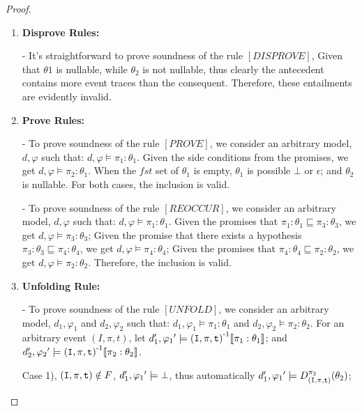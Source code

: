 \documentclass[acmsmall,10pt,review]{acmart}
\newcommand{\es}{\theta}
\newcommand{\code}[1]{{\tt{\ensuremath{\m{#1}}}}}
\newcommand{\codeme}[1]{{\tt{\ensuremath{#1}}}}
\newcommand{\bott}{\textcolor{black}{\ensuremath{\bot}}}
\newcommand{\CONTAIN}{\sqsubseteq}
\newcommand{\m}{\mathit}
\begin{document}
{{{\begin{proof}
\begin{enumerate}
  
  \item \textbf{Disprove Rules:} 
  
  - It's straightforward to prove soundness of the rule \codeme{[DISPROVE]}, Given that \codeme{ \es1} is nullable, while \codeme{ \es_2} is not nullable, thus clearly the antecedent contains more event traces than the consequent.  Therefore, these entailments are evidently invalid.\\
  
  
  \item \textbf{Prove Rules:} 
  
  - To prove soundness of the rule \code{[PROVE]}, we consider an arbitrary model, \codeme{d,  \varphi} such that:  \codeme{d,  \varphi \models  {\pi_1 : \es_1}}. Given the side conditions from the promises, we get \codeme{d,  \varphi \models {\pi_2 : \es_1}}. When the \code{\m{fst}} set of \code{\es_1} is empty, \code{\es_1} is possible \code{\bot} or \code{\epsilon}; and \code{\es_2} is nullable. For both cases, the inclusion is valid. 
  
  - To prove soundness of the rule \codeme{[REOCCUR]}, we consider an arbitrary model, \codeme{d,  \varphi} such that:  \codeme{d,  \varphi \models  {\pi_1 : \es_1}}. Given the promises that  \codeme{\pi_1 : \es_1 \CONTAIN \pi_3 : \es_3}, we get \codeme{d,  \varphi \models {\pi_3 : \es_3}}; Given the promise that there exists a hypothesis \codeme{\pi_3 : \es_3 \CONTAIN  \pi_4 : \es_4}, we get \codeme{d,  \varphi \models {\pi_4 : \es_4}}; Given the promises that  \codeme{\pi_4 : \es_4 \CONTAIN \pi_2 : \es_2}, we get \codeme{d,  \varphi \models {\pi_2 : \es_2}}. Therefore,  the inclusion is valid. 
  \\
  
  
  \item \textbf{Unfolding Rule:} 
  
  
  
  - To prove soundness of the rule \codeme{[UNFOLD]}, we consider an arbitrary model, \codeme{d_1,  \varphi_1} and \codeme{d_2,  \varphi_2}  such that:  \codeme{d_1,  \varphi_1 \models {\pi_1 : \es_1}} and \codeme{d_2,  \varphi_2 \models  {\pi_2 : \es_2}}. For an arbitrary event \codeme{(I, \pi, t)}, let \codeme{d_1^\prime, {\varphi_1}^\prime \models \codeme{(I, \pi, t)}^{\text{-}1}\llbracket  \pi_1: \es_1 \rrbracket}; and 
  \codeme{d_2^\prime, {\varphi_2}^\prime \models \codeme{(I, \pi, t)}^{\text{-}1}\llbracket \pi_2 : \es_2 \rrbracket}. 
  
  Case 1), \codeme{\codeme{(I, \pi, t)} \notin F}, \codeme{d_1^\prime, {\varphi_1}^\prime \models \bott}, thus automatically \codeme{d_1^\prime, {\varphi_1}^\prime \models D^{\pi_2}_{\codeme{(I, \pi, t)}}( \es_2)};
  

\end{enumerate}
\end{proof}}}}
\end{document}
